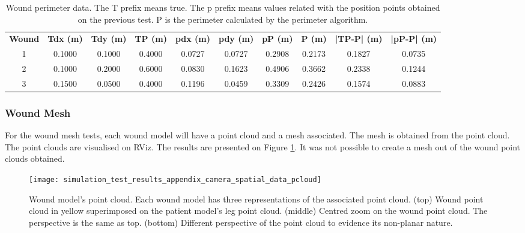 \begin{table}[htbp]
    \centering
    \caption[Wound perimeter data.]{Wound perimeter data. The T prefix means true. The p prefix means values related with the position points obtained on the previous test. P is the perimeter calculated by the perimeter algorithm.}
    \begin{adjustbox}{width=1.2\textwidth,center=\textwidth}
    \begin{tabular}{c|c|c|c|c|c|c|c|c|c}
         \toprule
         \textbf{Wound} & \textbf{Tdx (m)} & \textbf{Tdy (m)} & \textbf{TP (m)} & \textbf{pdx (m)} & \textbf{pdy (m)} & \textbf{pP (m)} & \textbf{P (m)} & \textbf{|TP-P| (m)} & \textbf{|pP-P| (m)} \\
         1 & 0.1000 & 0.1000 & 0.4000 & 0.0727 & 0.0727 & 0.2908 & 0.2173 & 0.1827 & 0.0735 \\
         2 & 0.1000 & 0.2000 & 0.6000 & 0.0830 & 0.1623 & 0.4906 & 0.3662 & 0.2338 & 0.1244 \\
         3 & 0.1500 & 0.0500 & 0.4000 & 0.1196 & 0.0459 & 0.3309 & 0.2426 & 0.1574 & 0.0883 \\
         \bottomrule
    \end{tabular}
    \end{adjustbox}
    \label{tab:wound_perimeter_results}
\end{table}


\subsubsection*{Wound Mesh}
\label{subsubsec:simulated_system_results_camera_spatial_data_processing_mesh}

For the wound mesh tests, each wound model will have a point cloud and a mesh associated. The mesh is obtained from the point cloud. The point clouds are visualised on RViz. The results are presented on Figure \ref{fig:simulation_test_results_camera_spatial_data_wound_pcloud_mesh_resume}. It was not possible to create a mesh out of the wound point clouds obtained.

\begin{figure}[htbp]
	\centering
	\texttt{[image: simulation\_test\_results\_appendix\_camera\_spatial\_data\_pcloud]}
	\caption[Wound model's point cloud.]{Wound model's point cloud. Each wound model has three representations of the associated point cloud. (top) Wound point cloud in yellow superimposed on the patient model's leg point cloud. (middle) Centred zoom on the wound point cloud. The perspective is the same as top. (bottom) Different perspective of the point cloud to evidence its non-planar nature. }
	\label{fig:simulation_test_results_camera_spatial_data_wound_pcloud_mesh_resume}
\end{figure}


